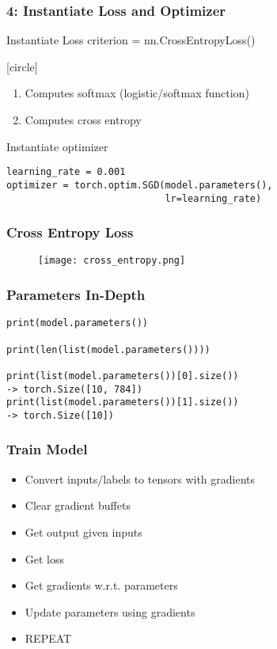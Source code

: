 \documentclass[14 pt]{beamer}
\let\olditem\item
\renewcommand{\item}{\olditem\vspace{4pt}}
\begin{document}
\begin{frame}[fragile]
  \frametitle{4: Instantiate Loss and Optimizer}
  \begin{block}{Instantiate Loss}
    criterion = nn.CrossEntropyLoss()  
  \end{block}
     [circle]
  \begin{enumerate}
  \item Computes softmax (logistic/softmax function) 
  \item Computes cross entropy
  \end{enumerate}

  \begin{block}{Instantiate optimizer}
\small{
\begin{verbatim}
learning_rate = 0.001
optimizer = torch.optim.SGD(model.parameters(), 
                            lr=learning_rate)  
\end{verbatim}
}
  \end{block}
\end{frame}

\begin{frame}
  \frametitle{Cross Entropy Loss}
  \begin{figure}
    \centering
    \texttt{[image: cross\_entropy.png]}
  \end{figure}
\end{frame}

\begin{frame}[fragile]
  \frametitle{Parameters In-Depth}
  \begin{block}{}
\begin{verbatim}
print(model.parameters())

print(len(list(model.parameters())))

print(list(model.parameters())[0].size())
-> torch.Size([10, 784])
print(list(model.parameters())[1].size())
-> torch.Size([10])
\end{verbatim}
  \end{block}
\end{frame}

\begin{frame}
  \frametitle{Train Model}
  \begin{itemize}
  \item Convert inputs/labels to tensors with gradients
  \item Clear gradient buffets
  \item Get output given inputs
  \item Get loss
  \item Get gradients w.r.t. parameters
  \item Update parameters using gradients
  \item REPEAT
  \end{itemize}
\end{frame}
\end{document}
